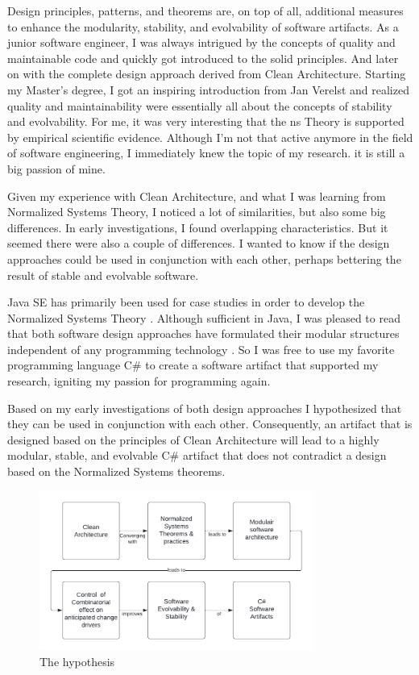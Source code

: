 Design principles, patterns, and theorems are, on top of all, additional measures to
enhance the modularity, stability, and evolvability of software artifacts. As a junior
software engineer, I was always intrigued by the concepts of quality and maintainable code
and quickly got introduced to the \gls{solid} principles. And later on with the complete
design approach derived from Clean Architecture. Starting my Master's degree, I got an
inspiring introduction from Jan Verelst and realized quality and maintainability were
essentially all about the concepts of stability and evolvability. For me, it was very
interesting that the \gls{ns} Theory is supported by empirical scientific evidence.
Although I'm not that active anymore in the field of software engineering, I immediately
knew the topic of my research. it is still a big passion of mine.

Given my experience with Clean Architecture, and what I was learning from Normalized
Systems Theory, I noticed a lot of similarities, but also some big differences. In early
investigations, I found overlapping characteristics. But it seemed there were also a couple
of differences. I wanted to know if the design approaches could be used in conjunction with
each other, perhaps bettering the result of stable and evolvable software.

Java SE has primarily been used for case studies in order to develop the Normalized
Systems Theory \parencite{oorts_building_2014, de_bruyn_enabling_2018}. Although
sufficient in Java, I was pleased to read that both software design approaches have
formulated their modular structures independent of any programming technology
\parencite{mannaert_normalized_2009,robert_c_martin_clean_2018}. So I was free to use my
favorite programming language C\# to create a software artifact that supported my
research, igniting my passion for programming again. 

Based on my early investigations of both design approaches I hypothesized that they can be
used in conjunction with each other. Consequently, an artifact that is designed based on
the principles of Clean Architecture will lead to a highly modular, stable, and evolvable
C\# artifact that does not contradict a design based on the Normalized Systems theorems.

\begin{figure}[H]
    \centering
    \includegraphics[width=0.8\textwidth]{Figures/hypothesis.pdf}
    \caption[The hypothesis]{The hypothesis}
    \label{fig_hypothesis}
\end{figure}


%

